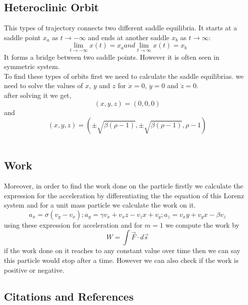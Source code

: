 \documentclass[%
reprint,
amsmath,amssymb,
aps,
floatfix,
]{revtex4-2}
\begin{document}
	\subsection{Heteroclinic Orbit}
	This types of trajectory connects two different saddle equilibria. It starts at a saddle point $x_a$ as $t\to-\infty$ and ends at another saddle $x_b$ as $t\to\infty$:
	\begin{equation}
		\lim_{t\to-\infty}x(t)= x_a	  and   \lim_{t\to\infty}x(t)= x_b
	\end{equation}
	It forms a bridge between two saddle points. However it is often seen in symmetric system.\\
	To find these types of orbits first we need to calculate the saddle equilibrias. we need to solve the values of $x$, $y$ and $z$ for $\dot{x}=0$, $\dot{y}=0$ and $\dot{z}=0$.\\
	after solving it we get,\\
	\begin{equation}
		(x,y,z) = (0,0,0)
	\end{equation}
	and
	\begin{equation}
		(x,y,z) = (\pm \sqrt{\beta(\rho -1)}, \pm \sqrt{\beta(\rho -1)}, \rho -1)
	\end{equation}
	\\
	\subsection{Work}
	Moreover, in order to find the work done on the particle firstly we calculate the expression for the acceleration by differentiating the the equation of this Lorenz system and for a unit mass particle we calculate the work on it.
	\begin{equation}
		a_x = \sigma(v_y - v_x);
		a_y = \gamma v_x + v_x z - v_z x +v_y;
		a_z = v_x y + v_y x - \beta v_z
	\end{equation} 
	using these expression for acceleration and for $m=1$ we compute the work by
	\begin{equation}
		W= \int \vec{F} \cdot d\vec{s}
	\end{equation}
	if the work done on it reaches to any constant value over time then we can say this particle would stop after a time. However we can also check if the work is positive or negative.
	\subsection{\label{sec:citeref}Citations and References}
	
\end{document}
